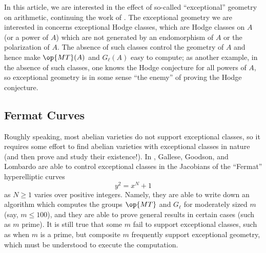 \documentclass[openany]{book}
\begin{document}
In this article, we are interested in the effect of so-called ``exceptional'' geometry on arithmetic, continuing the work of \cite{ggl-fermat}.
The exceptional geometry we are interested in concerns exceptional Hodge classes, which are Hodge classes on $A$ (or a power of $A$) which are not generated by an endomorphism of $A$ or the polarization of $A$. The absence of such classes control the geometry of $A$ and hence make $\op{MT}(A)$ and $G_\ell(A)$ easy to compute; as another example, in the absence of such classes, one knows the Hodge conjecture for all powers of $A$, so exceptional geometry is in some sense ``the enemy'' of proving the Hodge conjecture.

\subsection{Fermat Curves}
Roughly speaking, most abelian varieties do not support exceptional classes, so it requires some effort to find abelian varieties with exceptional classes in nature (and then prove and study their existence!). In \cite{ggl-fermat}, Gallese, Goodson, and Lombardo are able to control exceptional classes in the Jacobians of the ``Fermat'' hyperelliptic curves
\[y^2=x^N+1\]
as $N\ge1$ varies over positive integers. Namely, they are able to write down an algorithm which computes the groups $\op{MT}$ and $G_\ell$ for moderately sized $m$ (say, $m\le100$), and they are able to prove general results in certain cases (such as $m$ prime). It is still true that some $m$ fail to support exceptional classes, such as when $m$ is a prime, but composite $m$ frequently support exceptional geometry, which must be understood to execute the computation.
\end{document}
